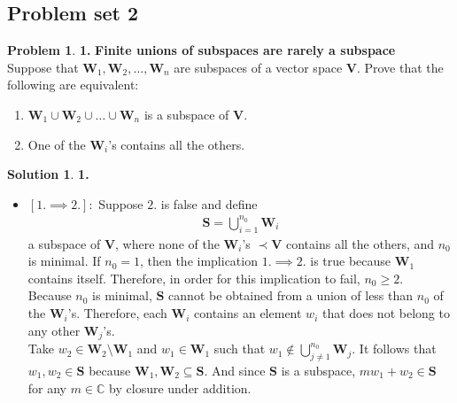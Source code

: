 \documentclass{article}
\theoremstyle{definition}
\newtheorem*{prob*}{Problem}
\newtheorem*{sln*}{Solution}
\newcommand{\V}{\mathbf{V}}
\newcommand{\W}{\mathbf{W}}
\begin{document}
\newpage




















\subsection{Problem set 2}
\begin{prob*}\textbf{1.}
	\textbf{Finite unions of subspaces are rarely a subspace}\\
	Suppose that $\W_1,\W_2,\dots,\W_n$ are subspaces of a vector space $\V$. Prove that the following are equivalent:
	\begin{enumerate}
		\item $\W_1 \cup \W_2\cup\dots\cup\W_n$ is a subspace of $\V$.
		\item One of the $\W_i$'s contains all the others. 
	\end{enumerate}
	
	
	\begin{sln*}\textbf{1.}
		$\,$
		\begin{itemize}
			\item $[1. \implies 2.]:$ Suppose $2.$ is false and define 
			\begin{align*}
			\mathbf{S} = \bigcup_{i=1}^{n_0}\W_i
			\end{align*}
			a subspace of $\V$, where none of the $\W_i$'s $\prec \V$ contains all the others, and $n_0$ is minimal. If $n_0=1$, then the implication $1. \implies 2.$ is true because $\W_1$ contains itself. Therefore, in order for this implication to fail, $n_0 \geq 2$.\\
			
			Because $n_0$ is minimal, $\mathbf{S}$ cannot be obtained from a union of less than $n_0$ of the $\W_i$'s. Therefore, each $\W_i$ contains an element $w_i$ that does not belong to any other $\W_j$'s.\\
			
			Take $w_2\in\W_2\setminus \W_1$ and $w_1 \in \W_1$ such that $w_1 \notin \bigcup_{j\neq 1}^{n_0}\W_j$. It follows that $w_1, w_2 \in \mathbf{S}$ because $\W_1, \W_2 \subseteq \mathbf{S}$. And since $\mathbf{S}$ is a subspace, $mw_1 + w_2 \in \mathbf{S}$ for any $m\in\mathbb{C}$ by closure under addition. \\
			

\end{itemize}
\end{sln*}
\end{prob*}
\end{document}
